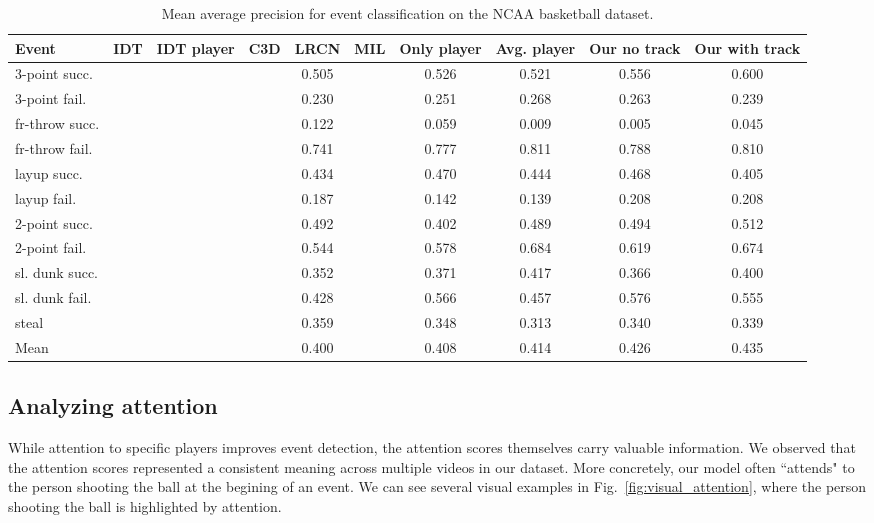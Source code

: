 \documentclass[10pt,twocolumn,letterpaper]{article}
\begin{document}
\begin{table}[ht!]
\begin{center}
\small
 \begin{tabular}{|l|c|c|c|c|c|c|c|c|c|}
  \hline
Event & IDT\cite{Wang_CVPR11} & IDT player\cite{Wang_CVPR11} & C3D \cite{Tran_arxiv14} & LRCN \cite{Donahue_arxiv14} & MIL\cite{} & Only player & Avg. player & Our no track & Our with track \\ \hline \hline
3-point succ.  &  &  &  & 0.505 &  & 0.526 & 0.521 & 0.556 & 0.600 \\
3-point fail.  &  &  &  & 0.230 &  & 0.251 & 0.268 & 0.263 & 0.239 \\
fr-throw succ. &  &  &  & 0.122 &  & 0.059 & 0.009 & 0.005 & 0.045 \\
fr-throw fail. &  &  &  & 0.741 &  & 0.777 & 0.811 & 0.788 & 0.810 \\
layup succ.    &  &  &  & 0.434 &  & 0.470 & 0.444 & 0.468 & 0.405 \\
layup fail.    &  &  &  & 0.187 &  & 0.142 & 0.139 & 0.208 & 0.208 \\
2-point succ.  &  &  &  & 0.492 &  & 0.402 & 0.489 & 0.494 & 0.512 \\
2-point fail.  &  &  &  & 0.544 &  & 0.578 & 0.684 & 0.619 & 0.674 \\
sl. dunk succ. &  &  &  & 0.352 &  & 0.371 & 0.417 & 0.366 & 0.400 \\
sl. dunk fail. &  &  &  & 0.428 &  & 0.566 & 0.457 & 0.576 & 0.555 \\
steal          &  &  &  & 0.359 &  & 0.348 & 0.313 & 0.340 & 0.339 \\ \hline \hline
Mean             &  &  &  & 0.400 &  & 0.408 & 0.414 & 0.426 & 0.435 \\ \hline
  \end{tabular}
\end{center}
  \caption{Mean average precision for event classification on the NCAA basketball dataset.}
  \label{tab:detection_res}
\end{table}

\subsection{Analyzing attention}
While attention to specific players improves event detection,
the attention scores themselves carry valuable information.
We observed that the attention scores represented a 
consistent meaning across multiple videos in our dataset.
More concretely, our model often ``attends" to the person shooting the
ball at the begining of an event. We can see several visual examples
in Fig.~\ref{fig:visual_attention}, where the person shooting
the ball is highlighted by attention.
\end{document}
